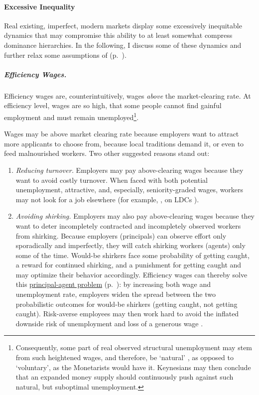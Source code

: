 \paragraph{Excessive Inequality} \label{sec:inequality-dynamics} Real existing, imperfect, modern markets display some excessively inequitable dynamics that may compromise this ability to at least somewhat compress dominance hierarchies. In the following, I discuss some of these dynamics and further relax some assumptions of   (p.~\pageref{sec:perfect-competition}). %

\subparagraph[Efficiency Wages]{Efficiency Wages.}  \label{sec:efficiency-wages} Efficiency wages are, counterintuitively, wages \emph{above} the market-clearing rate. At efficiency level, wages are so high, that some people cannot find gainful employment and must remain unemployed\footnote{
	Consequently, some part of real observed structural unemployment may stem from such heightened wages, and therefore, be `natural' \citep{Schlicht1978}, as opposed to `voluntary', as the Monetarists would have it. Keynesians may then conclude that an expanded money supply should continuously push against such natural, but suboptimal unemployment.}.

Wages may be above market clearing rate because employers want to attract more applicants to choose from, because local traditions demand it, or even to feed malnourished workers. Two other suggested reasons stand out: 

\begin{enumerate}
	\item \emph{Reducing turnover.} Employers may pay above-clearing wages because they want to avoid costly turnover. When faced with both potential unemployment, attractive, and, especially, seniority-graded wages, workers may not look for a job elsewhere (for example, \citealt{Salop1979}, on \glspl{LDC} \citealt{Stiglitz1974a}).
	\item \emph{Avoiding shirking.} Employers may also pay above-clearing wages because they want to deter incompletely contracted and incompletely observed workers from shirking. Because employers (principals) can observe effort only sporadically and imperfectly, they will catch shirking workers (agents) only some of the time. Would-be shirkers face some probability of getting caught, a reward for continued shirking, and a punishment for getting caught and may optimize their behavior accordingly. Efficiency wages can thereby solve this \hyperref[sec:principal-agent-problem]{principal-agent problem} (p.~\pageref{sec:principal-agent-problem}): by increasing both wage and unemployment rate, employers widen the spread between the two probabilistic outcomes for would-be shirkers (getting caught, not getting caught). Risk-averse employees may then work hard to avoid the inflated downside risk of unemployment and loss of a generous wage \citep{Stiglitz1984}.
\end{enumerate}

